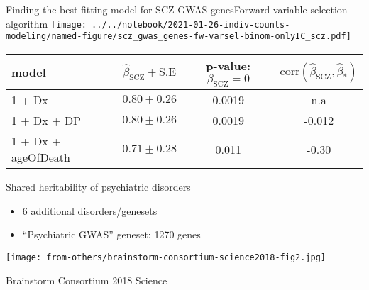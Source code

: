 \documentclass[usenames,dvipsnames]{beamer}
\begin{document}
\begin{frame}{Finding the best fitting model for SCZ GWAS genes}{Forward variable selection algorithm}
\small
\texttt{[image: ../../notebook/2021-01-26-indiv-counts-modeling/named-figure/scz\_gwas\_genes-fw-varsel-binom-onlyIC\_scz.pdf]}

\begin{center}
\begin{tabular}{l|ccc}
	\small
model & \(\hat{\beta}_\mathrm{SCZ} \pm \mathrm{S.E}\) & p-value:
\(\beta_\mathrm{SCZ} = 0\) &
\(\mathrm{corr}(\hat{\beta}_\mathrm{SCZ}, \hat{\beta}_\ast)\) \\
\hline
1 + Dx & \(0.80 \pm 0.26\) & 0.0019 & n.a \\
1 + Dx + DP & \(0.80 \pm 0.26\) & 0.0019 & -0.012 \\
1 + Dx + ageOfDeath & \(0.71 \pm 0.28\) & 0.011 & -0.30 \\
\end{tabular}
\end{center}
\end{frame}

\begin{frame}{Shared heritability of psychiatric disorders}
\small
\begin{itemize}
\item 6 additional disorders/genesets
\item ``Psychiatric GWAS'' geneset: 1270 genes
\end{itemize}
\texttt{[image: from-others/brainstorm-consortium-science2018-fig2.jpg]}

{\tiny Brainstorm Consortium 2018 Science}
\end{frame}
\end{document}
